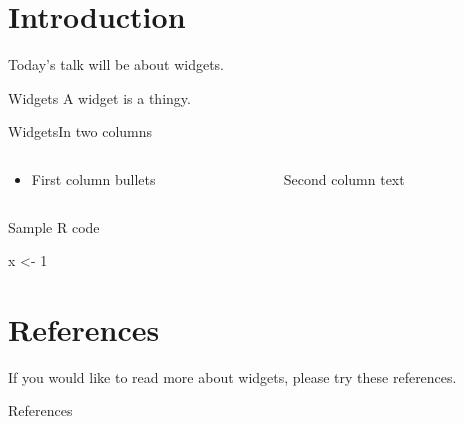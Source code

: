 
\subtitle{Optional subtitle}
\date{9 September 2011}
\author[Bloggs]{Prof.\ J.\ Bloggs}



\begin{frame}
\maketitle
\end{frame}


\section{Introduction}
Today's talk will be about widgets.  

\begin{frame}{Widgets}
A widget is a thingy.
\end{frame}

\begin{frame}{Widgets}{In two columns}
\begin{columns}[t]
\begin{column}{0.5\textwidth}
\begin{itemize}
\item First column bullets
\end{itemize}
\end{column}
\pause %
\begin{column}{0.5\textwidth}
Second column text \citep{Body2000}
\end{column}
\end{columns}
\end{frame}

\begin{frame}[fragile]{Sample R code}
\begin{rcode}
x <- 1
\end{rcode}
\end{frame}

\section{References}
If you would like to read more about widgets, please try these references.

\begin{frame}[allowframebreaks]{References}


\end{frame}


